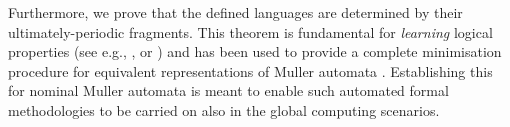 Furthermore, we prove that the defined languages are determined by their ultimately-periodic fragments. This theorem is fundamental for \emph{learning} logical properties (see e.g., \cite{MP95}, or \cite{FCCTW08}) and has been used to provide a complete minimisation procedure for equivalent representations of Muller automata \cite{CV12}. Establishing this for nominal Muller automata is meant to enable such automated formal methodologies to be carried on also in the global computing scenarios.
% 
% 
% 
